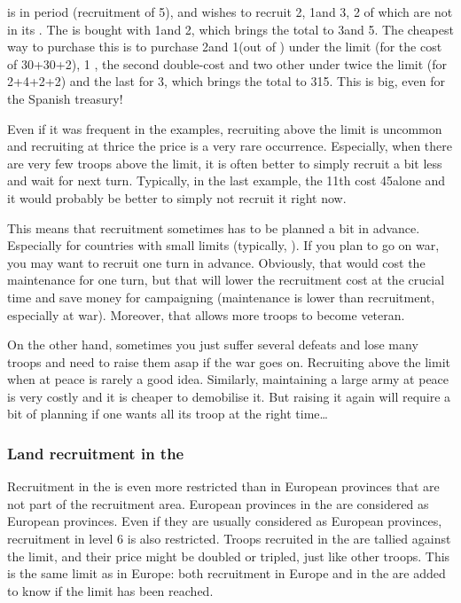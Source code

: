\begin{exemple}
  \HIS is \TARQ in period  (recruitment of 5\LD), and wishes to
  recruit 2\ARMY\facemoins, 1\ARMY\faceplus and 3\LD, 2 of which are not in
  its . The \ARMY\faceplus is bought with
  1\ARMY\facemoins and 2\LD, which brings the total to 3\ARMY\Facemoins and
  5\LD.  The cheapest way to purchase this is to purchase 2\ARMY and 1\LD (out
  of ) under the limit (for the cost of
  30+30+2), 1 \ARMY, the second double-cost \LD and two other
  \LD under twice the limit (for 2+4+2+2) and the last \LD for 3, which brings the total to 315\ducats. This is big, even for the Spanish
  treasury!
\end{exemple}

\begin{playtip}
  Even if it was frequent in the examples, recruiting above the limit is
  uncommon and recruiting at thrice the price is a very rare
  occurrence. Especially, when there are very few troops above the limit, it
  is often better to simply recruit a bit less and wait for next
  turn. Typically, in the last example, the 11th \LD cost 45\ducats alone and
  it would probably be better to simply not recruit it right now.

  This means that recruitment sometimes has to be planned a bit in
  advance. Especially for countries with small limits (typically, \ANG). If
  you plan to go on war, you may want to recruit one turn in
  advance. Obviously, that would cost the maintenance for one turn, but that
  will lower the recruitment cost at the crucial time and save money for
  campaigning (maintenance is lower than recruitment, especially at
  war). Moreover, that allows more troops to become veteran.

  On the other hand, sometimes you just suffer several defeats and lose many
  troops and need to raise them asap if the war goes on. Recruiting above the
  limit when at peace is rarely a good idea. Similarly, maintaining a large
  army at peace is very costly and it is cheaper to demobilise it. But raising
  it again will require a bit of planning if one wants all its troop at the
  right time\ldots
\end{playtip}


\subsubsection{Land recruitment in the \ROTW}
\aparag Recruitment in the \ROTW is even more restricted than in European
provinces that are not part of the recruitment area.
\bparag European provinces in the \ROTW are considered as European provinces.
\bparag Even if they are usually considered as European provinces, recruitment
in level 6 \COL is also restricted.
\bparag Troops recruited in the \ROTW are tallied against the limit, and their
price might be doubled or tripled, just like other troops. This is the same
limit as in Europe: both recruitment in Europe and in the \ROTW are added to
know if the limit has been reached.

